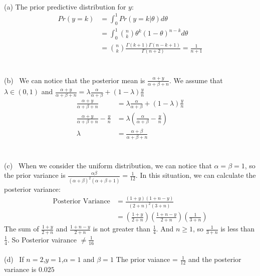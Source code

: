 \documentclass[11pt]{article}
\begin{document}
  \paragraph{\color{red}{Quesion Four Answer:}}
  (a) The prior predictive distribution for $y$: \\
  \begin{align*}
    Pr(y = k) &= \int^1_0 Pr(y = k|\theta) d\theta \\
    &= \int^1_0 \binom{n}{k} \theta^k(1-\theta)^{n-k}d\theta \\
    &= \binom{n}{k}\frac{\Gamma(k+1)\Gamma(n-k+1)}{\Gamma(n+2)} = \frac{1}{n+1}
  \end{align*}
  \\
  \\
  (b) \ We can notice that the posterior mean is $\frac{\alpha + y}{\alpha + \beta + n}$. We assume that $\lambda \in (0,1)$ and $\frac{\alpha + y}{\alpha + \beta + n} = \lambda \frac{\alpha}{\alpha + \beta} + (1- \lambda)\frac{y}{n}$\\
  \begin{align*}
    \frac{\alpha + y}{\alpha + \beta + n} &= \lambda \frac{\alpha}{\alpha + \beta} + (1- \lambda)\frac{y}{n} \\
    \frac{\alpha + y}{\alpha + \beta + n} - \frac{y}{n} &= \lambda (\frac{\alpha}{\alpha + \beta} - \frac{y}{n}) \\
    \lambda &= \frac{\alpha + \beta}{\alpha + \beta + n}
  \end{align*}
  \\
  \\
  (c) \ When we consider the uniform distribution, we can notice that $\alpha = \beta = 1$, so the prior variance is $\frac{\alpha \beta}{(\alpha + \beta)^2(\alpha + \beta + 1)} = \frac{1}{12}$. In this situation, we can calculate the posterior variance:\\
  \begin{align*}
    \text{Posterior Variance} &= \frac{(1 + y)(1+n-y)}{(2+n)^2(3+n)} \\
    &= (\frac{1+y}{2+n})(\frac{1+n-y}{2+n})(\frac{1}{3+n})
  \end{align*}
  The sum of $\frac{1+y}{2+n}$ and $\frac{1+n-y}{2+n}$ is not greater than $\frac{1}{4}$. And $n \geq 1$, so $\frac{1}{3+n}$ is less than $\frac{1}{4}$. So Posterior vairance $\neq \frac{1}{16}$
  \\
  \\
  (d) \ If $n = 2$,$y = 1$,$\alpha = 1$ and $\beta = 1$ The prior vaiance = $\frac{1}{12}$ and the posterior variance is $0.025$
\end{document}
